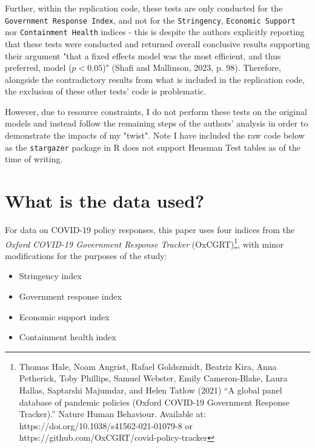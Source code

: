 \documentclass[12pt,letterpaper]{article}
\begin{document}
	\noindent Further, within the replication code, these tests are only conducted for the \texttt{Government Response Index}, and not for the \texttt{Stringency}, \texttt{Economic Support} nor \texttt{Containment Health} indices - this is despite the authors explicitly reporting that these tests were conducted and returned overall conclusive results supporting their argument "that a fixed effects model was the most efficient, and thus preferred,  model ($p < 0.05$)" (Shafi and Mallinson, 2023, p. 98). Therefore, alongside the contradictory results from what is included in the replication code, the exclusion of these other tests' code is problematic.
	
	\vspace{.25cm}
	
	\noindent However, due to resource constraints, I do not perform these tests on the original models and instead follow the remaining steps of the authors' analysis in order to demonstrate the impacts of my "twist". Note I have included the raw code below as the \texttt{stargazer} package in R does not support Heusman Test tables as of the time of writing.
	
	
	
	\vspace{.25cm}

\newpage
	\section*{What is the data used?}
	\vspace{.25cm}
	\noindent For data on COVID-19 policy responses, this paper uses four indices from the \textit{Oxford COVID-19 Government Response Tracker} (OxCGRT)\footnote{Thomas Hale, Noam Angrist, Rafael Goldszmidt, Beatriz Kira, Anna Petherick, Toby Phillips, Samuel Webster, Emily Cameron-Blake, Laura Hallas, Saptarshi Majumdar, and Helen Tatlow (2021) “A global panel database of pandemic policies (Oxford COVID-19 Government Response Tracker).” Nature Human Behaviour. Available at: https://doi.org/10.1038/s41562-021-01079-8 or https://github.com/OxCGRT/covid-policy-tracker}, with minor modifications for the purposes of the study:
	\begin{itemize}
		\item Stringency index
		\item Government response index
		\item Economic support index
		\item Containment health index
	\end{itemize}
	
\end{document}
